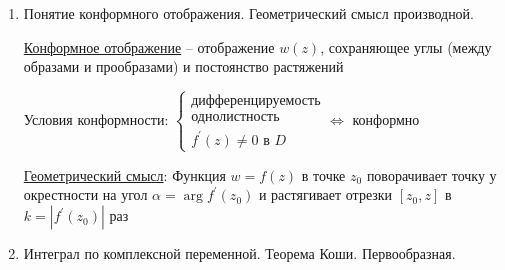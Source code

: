 \begin{enumerate}
    \underline{\hyperlink{analytic_function_properties}{Свойства аналитических функций}}: пусть $f, g$ - аналитические функции, тогда:

    \begin{enumerate}[label=\arabic*$^\circ$]
        \item Линейность: $af + bg$ - аналитическая
        \item Композиция: $f(g(z))$ - аналитическая
        \item Произведение: $f \cdot g$ - аналитическая
        \item $f(z)$ аналитична в $D \ (f : D \longrightarrow D^\prime)$, $f^\prime(z) \neq 0 \ \forall z \in D$. 
        Тогда $\exists g(w) = f^{-1}(z) \ (g : D^\prime \longrightarrow D)$ и $\forall z_0 \in D \ f^\prime_z (z_0) = \frac{1}{g^\prime_w (w_0)}$, где $w_0 = w(z)$
        
        \item $f(z) = u(x, y) + i v(x, y)$ аналитична в $D$. Тогда $u(x, y), v(x, y)$ -- гармонические функции в $D$

        \item Если $f(z) = u(x, y) + i v(x, y)$ аналитична в $D$ и известна $u(x, y)$ или $v(x, y)$, то $f(z)$ определяется однозначно с точностью до $\operatorname{const}$
    \end{enumerate}

    \item Понятие конформного отображения. Геометрический смысл производной.

    \Def \hyperlink{conformal_map}{Конформное отображение} -- отображение $w(z)$, сохраняющее углы (между образами и прообразами) и постоянство растяжений

    \begin{MyTheorem}
        \Ths Условия конформности: $\begin{cases}\text{дифференцируемость} \\ \text{однолистность} \\ f^\prime(z) \neq 0 \text{ в } D\end{cases} \Longleftrightarrow$ конформно
    \end{MyTheorem}

    \hyperlink{geometrical_meaning_of_derivative}{Геометрический смысл}: Функция $w = f(z)$ в точке $z_0$ поворачивает точку у окрестности на угол $\alpha = \arg f^\prime(z_0)$ и растягивает отрезки $[z_0, z]$ в $k = |f^\prime(z_0)|$ раз


    \item Интеграл по комплексной переменной. Теорема Коши. Первообразная.
    

\end{enumerate}
